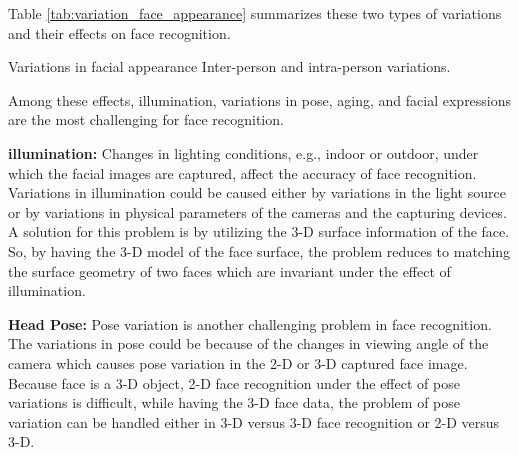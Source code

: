 Table \ref{tab:variation_face_appearance} summarizes these two types
of variations and their effects on face recognition.

 \caption{Variations in facial appearance Inter-person
and intra-person variations.} \label{tab:variation_face_appearance}
\etable

Among these effects, illumination, variations in pose, aging, and
facial expressions are the most challenging for face recognition.

\bi
\item \textbf{illumination:} Changes in lighting conditions, e.g.,
indoor or outdoor, under which the facial images are captured,
affect the accuracy of face recognition. Variations in illumination
could be caused either by variations in the light source or by
variations in physical parameters of the cameras and the capturing
devices. A solution for this problem is by utilizing the 3-D surface
information of the face. So, by having the 3-D model of the face
surface, the problem reduces to matching the surface geometry of two
faces which are invariant under the effect of illumination.

\item \textbf{Head Pose:} Pose variation is another challenging problem in face
recognition. The variations in pose could be because of the changes
in viewing angle of the camera which causes pose variation in the
2-D or 3-D captured face image. Because face is a 3-D object, 2-D
face recognition under the effect of pose variations is difficult,
while having the 3-D face data, the problem of pose variation can be
handled either in 3-D versus 3-D face recognition or 2-D versus 3-D.

